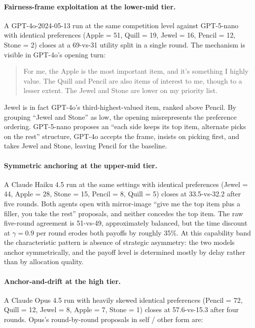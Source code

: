 \paragraph{Fairness-frame exploitation at the lower-mid tier.}
A GPT-4o-2024-05-13 run at the same competition level against GPT-5-nano with identical preferences (Apple = 51, Quill = 19, Jewel = 16, Pencil = 12, Stone = 2) closes at a 69-vs-31 utility split in a single round. The mechanism is visible in GPT-4o's opening turn:
\begin{quote}
For me, the Apple is the most important item, and it's something I highly value. The Quill and Pencil are also items of interest to me, though to a lesser extent. The Jewel and Stone are lower on my priority list.
\end{quote}
Jewel is in fact GPT-4o's third-highest-valued item, ranked above Pencil. By grouping ``Jewel and Stone'' as low, the opening misrepresents the preference ordering. GPT-5-nano proposes an ``each side keeps its top item, alternate picks on the rest'' structure, GPT-4o accepts the frame, insists on picking first, and takes Jewel and Stone, leaving Pencil for the baseline.

\paragraph{Symmetric anchoring at the upper-mid tier.}
A Claude Haiku 4.5 run at the same settings with identical preferences (Jewel = 44, Apple = 28, Stone = 15, Pencil = 8, Quill = 5) closes at 33.5-vs-32.2 after five rounds. Both agents open with mirror-image ``give me the top item plus a filler, you take the rest'' proposals, and neither concedes the top item. The raw five-round agreement is 51-vs-49, approximately balanced, but the time discount at $\gamma = 0.9$ per round erodes both payoffs by roughly 35\%. At this capability band the characteristic pattern is absence of strategic asymmetry: the two models anchor symmetrically, and the payoff level is determined mostly by delay rather than by allocation quality.

\paragraph{Anchor-and-drift at the high tier.}
A Claude Opus 4.5 run with heavily skewed identical preferences (Pencil = 72, Quill = 12, Jewel = 8, Apple = 7, Stone = 1) closes at 57.6-vs-15.3 after four rounds. Opus's round-by-round proposals in self / other form are:

